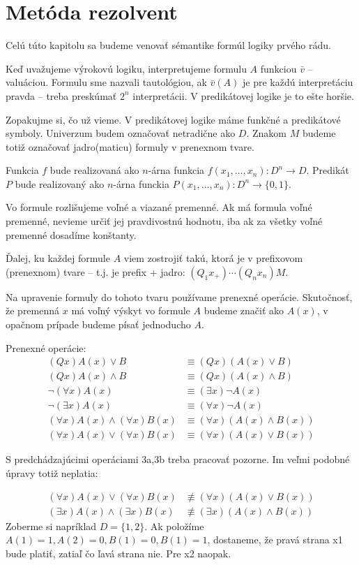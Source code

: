 \section{Metóda rezolvent}

Celú túto kapitolu sa budeme venovať sémantike formúl logiky prvého
rádu.

Keď uvažujeme výrokovú logiku, interpretujeme formulu $A$ funkciou
$\bar{v}$ -- valuáciou.
Formulu sme nazvali tautológiou, ak $\bar{v}(A)$ je pre každú
interpretáciu pravda -- treba preskúmať $2^n$ interpretácii.
V predikátovej logike je to ešte horšie.

Zopakujme si, čo už vieme. V predikátovej logike máme funkčné a
predikátové symboly. Univerzum budem označovať netradične ako $D$.
Znakom $M$ budeme totiž označovať jadro(maticu) formuly v prenexnom
tvare.

Funkcia $f$ bude realizovaná ako $n$-árna funkcia $f(x_1,\dots,x_n): D^n \rightarrow D$.
Predikát $P$ bude realizovaný ako $n$-árna funckia
$P(x_1,\dots,x_n): D^n \rightarrow \{0,1\}$.

Vo formule rozlišujeme voľné a viazané premenné.
Ak má formula voľné premenné, nevieme určiť jej pravdivostnú hodnotu,
iba ak za všetky voľné premenné dosadíme konštanty.

Ďalej, ku každej formule $A$ viem zostrojiť takú,
ktorá je v prefixovom (prenexnom) tvare -- t.j. je 
prefix + jadro: $(Q_1 x_+)\cdots(Q_n x_n)M$.

Na upravenie formuly do tohoto tvaru používame prenexné operácie.
Skutočnosť, že premenná $x$ má voľný výskyt vo formule $A$ budeme
značiť ako $A(x)$, v opačnom prípade budeme písať jednoducho $A$.

\medskip
Prenexné operácie:
\begin{align*}
    (Qx)A(x) \lor B &\equiv (Qx)(A(x) \lor B) \tag{1a}\\
    (Qx)A(x) \land B &\equiv (Qx)(A(x) \land B) \tag{1b}\\
    \neg (\forall x) A(x) &\equiv (\exists x) \neg A(x) \tag{2a}\\
    \neg (\exists x) A(x) &\equiv (\forall x) \neg A(x) \tag{2b}\\
    (\forall x) A(x) \land (\forall x) B(x) &\equiv 
        (\forall x) (A(x) \land B(x)) \tag{3a}\\
    (\forall x) A(x) \lor (\forall x) B(x) &\equiv
        (\forall x) (A(x) \lor B(x)) \tag{3b}
\end{align*}
\begin{poznamka}
    S predchádzajúcimi operáciami 3a,3b treba pracovať pozorne. Im veľmi
    podobné úpravy totiž neplatia:

    \begin{align*}
      (\forall x) A(x) \lor (\forall x) B(x)  & \not \equiv
        (\forall x) (A(x) \lor B(x)) \tag{x1}\\
      (\exists x) A(x) \land (\exists x) B(x) & \not \equiv
        (\exists x) (A(x) \land B(x)) \tag{x2}
    \end{align*}
    Zoberme si napríklad $D=\{1,2\}$. Ak položíme
    $A(1)=1, A(2)=0, B(1)=0, B(1)=1$, dostaneme, že pravá strana x1 bude
    platiť, zatiaľ čo ľavá strana nie. Pre x2 naopak.
\end{poznamka}

